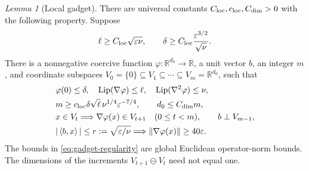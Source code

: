 \documentclass[11pt]{article}
\newtheorem{lemma}[theorem]{Lemma}
\theoremstyle{remark}
\newtheorem{lemma}[lemma]{Lemma}
\theoremstyle{remark}
\newcommand{\R}{\mathbb R}
\newcommand{\eps}{\varepsilon}
\newcommand{\norm}[1]{\left\lVert#1\right\rVert}
\newcommand{\ip}[2]{\left\langle#1,#2\right\rangle}
\newcommand{\Lip}{\operatorname{Lip}}
\begin{document}
\begin{lemma}[Local gadget]\label{lem:local-gadget}
There are universal constants $C_{\rm loc},c_{\rm loc},C_{\rm dim}>0$ with the following property. Suppose
\begin{equation}\label{eq:gadget-assumptions}
 \ell\ge C_{\rm loc}\sqrt{\eps\nu},\qquad
 \delta\ge C_{\rm loc}\frac{\eps^{3/2}}{\sqrt\nu}.
\end{equation}
There is a nonnegative coercive function $\varphi:\R^{d_0}\to\R$, a unit vector $b$, an integer $m$, and coordinate subspaces
$V_0=\{0\}\subseteq V_1\subseteq\cdots\subseteq V_m=\R^{d_0}$, such that
\begin{align}
 &\varphi(0)\le\delta,\quad
 \Lip(\nabla\varphi)\le\ell,\quad
 \Lip(\nabla^2\varphi)\le\nu,\label{eq:gadget-regularity}\\
 &m\ge c_{\rm loc}\delta\sqrt\ell\,\nu^{1/4}\eps^{-7/4},
 \qquad d_0\le C_{\rm dim}m,\label{eq:gadget-length}\\
 &x\in V_t\Longrightarrow\nabla\varphi(x)\in V_{t+1}
 \quad(0\le t<m),\qquad b\perp V_{m-1},\label{eq:gadget-filtration}\\
 &|\ip bx|\le r:=\sqrt{\eps/\nu}
 \Longrightarrow\norm{\nabla\varphi(x)}\ge40\eps.
 \label{eq:gadget-robust}
\end{align}
The bounds in \eqref{eq:gadget-regularity} are global Euclidean operator-norm bounds. The dimensions of the increments $V_{t+1}\ominus V_t$ need not equal one.
\end{lemma}
\end{document}
